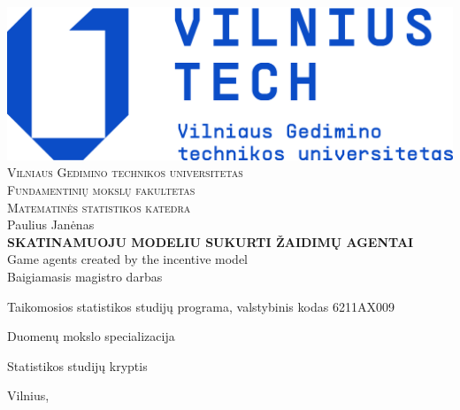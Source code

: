 \documentclass[a4paper, 12pt]{article}
\begin{document}

\begin{titlepage}
\setcounter{page}{-2}
\centering
%
\includegraphics[scale = 0.08]{VT_pilnas_BlueTransparent}\\[0.5\baselineskip]
%
{\Large\scshape Vilniaus Gedimino technikos universitetas}\\[0.2\baselineskip]
{\large\scshape Fundamentinių mokslų fakultetas}\\[0.2\baselineskip]
{\large\scshape Matematinės statistikos katedra}\\[0.2\baselineskip]
%
\vspace{\fill}
%
{\Large Paulius Janėnas}\\[3.0\baselineskip]

\MakeUppercase{\Large\bfseries Skatinamuoju modeliu sukurti žaidimų agentai }\\[0.3\baselineskip]
{\Large Game agents created by the incentive model}\\[1.0\baselineskip]

{\Large Baigiamasis magistro darbas}

\vspace{\fill}

Taikomosios statistikos studijų programa, valstybinis kodas 6211AX009

Duomenų mokslo specializacija

Statistikos studijų kryptis


\vspace{\fill}
%
Vilnius, \the\year
\end{titlepage}


\end{document}
